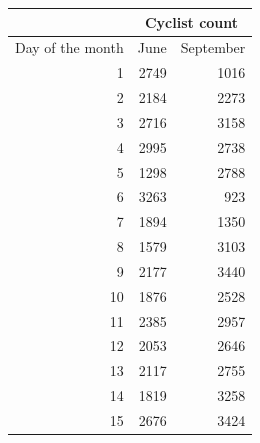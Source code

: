 \begin{table}[H]
\centering
\begin{tabular}{|r|r|r|}
\hline
\multicolumn{1}{|l|}{}                 & \multicolumn{2}{c|}{Cyclist count}                         \\ \hline
\multicolumn{1}{|l|}{Day of the month} & \multicolumn{1}{l|}{June} & \multicolumn{1}{l|}{September} \\ \hline
1                                      & 2749                      & 1016                           \\ \hline
2                                      & 2184                      & 2273                           \\ \hline
3                                      & 2716                      & 3158                           \\ \hline
4                                      & 2995                      & 2738                           \\ \hline
5                                      & 1298                      & 2788                           \\ \hline
6                                      & 3263                      & 923                            \\ \hline
7                                      & 1894                      & 1350                           \\ \hline
8                                      & 1579                      & 3103                           \\ \hline
9                                      & 2177                      & 3440                           \\ \hline
10                                     & 1876                      & 2528                           \\ \hline
11                                     & 2385                      & 2957                           \\ \hline
12                                     & 2053                      & 2646                           \\ \hline
13                                     & 2117                      & 2755                           \\ \hline
14                                     & 1819                      & 3258                           \\ \hline
15                                     & 2676                      & 3424                           \\ \hline

\end{tabular}
\end{table}
